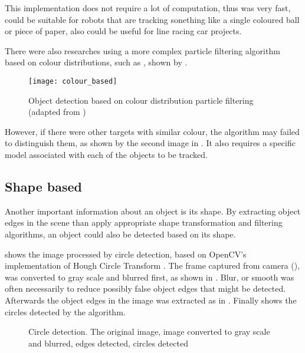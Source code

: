 This implementation does not require a lot of computation, thus was very fast, could be suitable for robots that are tracking sonething like a single coloured ball or piece of paper, also could be useful for line racing car projects.

There were also researches using a more complex particle filtering algorithm based on colour distributions, such as \cite{nummiaro2003color}, shown by .

\begin{figure}[H]
  \centering
  \texttt{[image: colour\_based]}
  \caption{Object detection based on colour distribution particle filtering (adapted from \cite{nummiaro2003color})}
  \label{Figure:nummiaro2003color}
\end{figure}

However, if there were other targets with similar colour, the algorithm may failed to distinguish them, as shown by the second image in . It also requires a specific model associated with each of the objects to be tracked.

\subsection{Shape based}

Another important information about an object is its shape. By extracting object edges in the scene than apply appropriate shape transformation and filtering algorithms, an object could also be detected based on its shape.

 shows the image processed by circle detection, based on OpenCV's implementation of Hough Circle Transform \cite{opencv:hough_circle}. The frame captured from camera (), was converted to gray scale and blurred first, as shown in . Blur, or smooth was often necessarily to reduce possibly false object edges that might be detected. Afterwards the object edges in the image was extracted as in . Finally  shows the circles detected by the algorithm.

\begin{figure}[H]
  \centering
  \caption{Circle detection.  The original image,  image converted to gray scale and blurred,  edges detected,  circles detected}
  \label{Figure:circles}
\end{figure}

